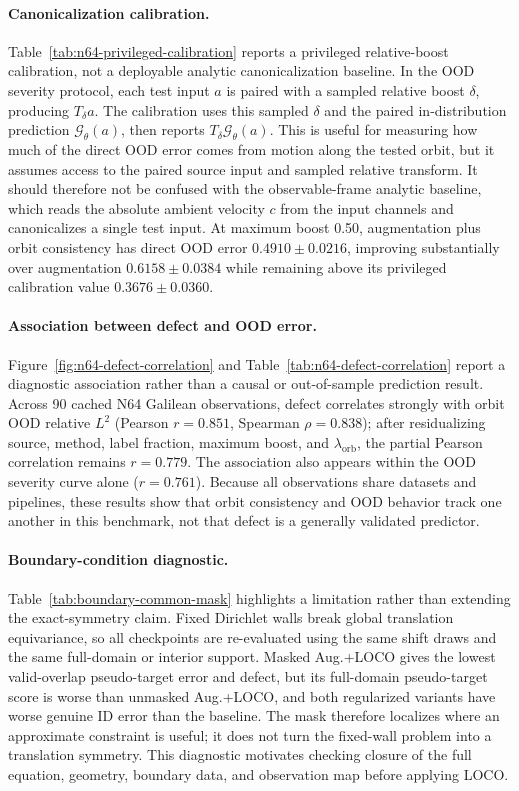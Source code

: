 \paragraph{Canonicalization calibration.} Table~\ref{tab:n64-privileged-calibration} reports a privileged relative-boost calibration, not a deployable analytic canonicalization baseline. In the OOD severity protocol, each test input \(a\) is paired with a sampled relative boost \(\delta\), producing \(T_\delta a\). The calibration uses this sampled \(\delta\) and the paired in-distribution prediction \(\mathcal G_\theta(a)\), then reports \(T_\delta \mathcal G_\theta(a)\). This is useful for measuring how much of the direct OOD error comes from motion along the tested orbit, but it assumes access to the paired source input and sampled relative transform. It should therefore not be confused with the observable-frame analytic baseline, which reads the absolute ambient velocity \(c\) from the input channels and canonicalizes a single test input. At maximum boost 0.50, augmentation plus orbit consistency has direct OOD error \(0.4910\pm0.0216\), improving substantially over augmentation \(0.6158\pm0.0384\) while remaining above its privileged calibration value \(0.3676\pm0.0360\).

\paragraph{Association between defect and OOD error.} Figure~\ref{fig:n64-defect-correlation} and Table~\ref{tab:n64-defect-correlation} report a diagnostic association rather than a causal or out-of-sample prediction result. Across 90 cached N64 Galilean observations, defect correlates strongly with orbit OOD relative \(L^2\) (Pearson \(r=0.851\), Spearman \(\rho=0.838\)); after residualizing source, method, label fraction, maximum boost, and \(\lambda_{\mathrm{orb}}\), the partial Pearson correlation remains \(r=0.779\). The association also appears within the OOD severity curve alone (\(r=0.761\)). Because all observations share datasets and pipelines, these results show that orbit consistency and OOD behavior track one another in this benchmark, not that defect is a generally validated predictor.

\paragraph{Boundary-condition diagnostic.} Table~\ref{tab:boundary-common-mask}
highlights a limitation rather than extending the exact-symmetry claim.  Fixed
Dirichlet walls break global translation equivariance, so all checkpoints are
re-evaluated using the same shift draws and the same full-domain or interior
support.  Masked Aug.+LOCO gives the lowest valid-overlap pseudo-target error and
defect, but its full-domain pseudo-target score is worse than unmasked Aug.+LOCO,
and both regularized variants have worse genuine ID error than the baseline.  The mask
therefore localizes where an approximate constraint is useful; it does not turn
the fixed-wall problem into a translation symmetry.  This diagnostic motivates
checking closure of the full equation, geometry, boundary data, and observation
map before applying LOCO.

